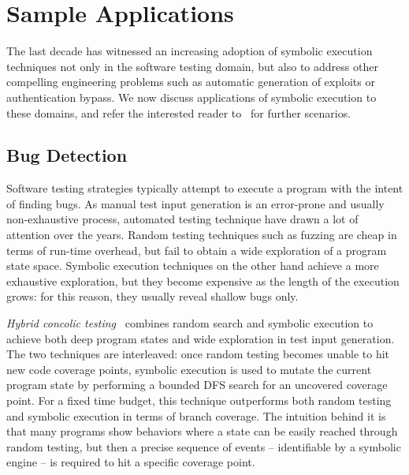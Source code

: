 
\section{Sample Applications}
\label{se:applications}

The last decade has witnessed an increasing adoption of symbolic execution techniques not only in the software testing domain, but also to address other compelling engineering problems such as automatic generation of exploits or authentication bypass. We now discuss  applications of symbolic execution to these domains, and refer the interested reader to~\cite{CGK-ICSE11} for further scenarios.

\subsection{Bug Detection}
\label{ss:bug-detection}

Software testing strategies typically attempt to execute a program with the intent of finding bugs. As manual test input generation is an error-prone and usually non-exhaustive process, automated testing technique have drawn a lot of attention over the years. Random testing techniques such as fuzzing are cheap in terms of run-time overhead, but fail to obtain a wide exploration of a program state space. Symbolic execution techniques on the other hand achieve a more exhaustive exploration, but they become expensive as the length of the execution grows: for this reason, they usually reveal shallow bugs only.

{\em Hybrid concolic testing}~\cite{RK-ICSE07} combines random search and symbolic execution to achieve both deep program states and wide exploration in test input generation. The two techniques are interleaved: once random testing becomes unable to hit new code coverage points, symbolic execution is used to mutate the current program state by performing a bounded DFS search for an uncovered coverage point. For a fixed time budget, this technique outperforms both random testing and symbolic execution in terms of branch coverage. The intuition behind it is that many programs show behaviors where a state can be easily reached through random testing, but then a precise sequence of events -- identifiable by a symbolic engine -- is required to hit a specific coverage point.

